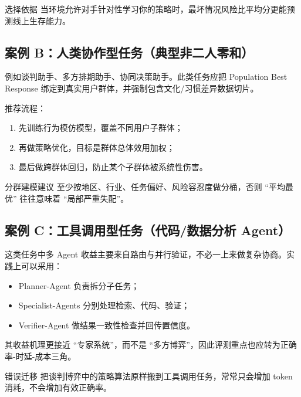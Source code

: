 \documentclass[a4paper]{article}
\begin{document}
\begin{importantbox}{选择依据}
当环境允许对手针对性学习你的策略时，最坏情况风险比平均分更能预测线上生存能力。
\end{importantbox}

\subsection{案例 B：人类协作型任务（典型非二人零和）}
例如谈判助手、多方排期助手、协同决策助手。此类任务应把 Population Best Response 绑定到真实用户群体，并强制包含文化/习惯差异数据切片。

推荐流程：
\begin{enumerate}
    \item 先训练行为模仿模型，覆盖不同用户子群体；
    \item 再做策略优化，目标是群体总体效用加权；
    \item 最后做跨群体回归，防止某个子群体被系统性伤害。
\end{enumerate}

\begin{knowledgebox}{分群建模建议}
至少按地区、行业、任务偏好、风险容忍度做分桶，否则 ``平均最优'' 往往意味着 ``局部严重失配''。
\end{knowledgebox}

\subsection{案例 C：工具调用型任务（代码/数据分析 Agent）}
这类任务中多 Agent 收益主要来自路由与并行验证，不必一上来做复杂协商。实践上可以采用：
\begin{itemize}
    \item Planner-Agent 负责拆分子任务；
    \item Specialist-Agents 分别处理检索、代码、验证；
    \item Verifier-Agent 做结果一致性检查并回传置信度。
\end{itemize}

其收益机理更接近 ``专家系统''，而不是 ``多方博弈''，因此评测重点也应转为正确率-时延-成本三角。

\begin{warningbox}{错误迁移}
把谈判博弈中的策略算法原样搬到工具调用任务，常常只会增加 token 消耗，不会增加有效正确率。
\end{warningbox}
\end{document}

